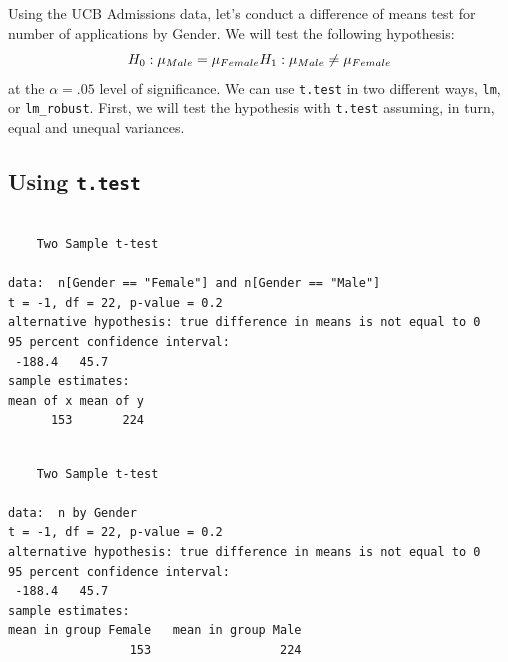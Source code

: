 \documentclass[]{book}
\newenvironment{Shaded}{\begin{snugshade}}{\end{snugshade}}
\newcommand{\CommentTok}[1]{\textcolor[rgb]{0.56,0.35,0.01}{\textit{#1}}}
\newcommand{\DataTypeTok}[1]{\textcolor[rgb]{0.13,0.29,0.53}{#1}}
\newcommand{\KeywordTok}[1]{\textcolor[rgb]{0.13,0.29,0.53}{\textbf{#1}}}
\newcommand{\NormalTok}[1]{#1}
\newcommand{\OperatorTok}[1]{\textcolor[rgb]{0.81,0.36,0.00}{\textbf{#1}}}
\newcommand{\OtherTok}[1]{\textcolor[rgb]{0.56,0.35,0.01}{#1}}
\newcommand{\StringTok}[1]{\textcolor[rgb]{0.31,0.60,0.02}{#1}}
\begin{document}
Using the UCB Admissions data, let's conduct a difference of means test for number of applications by Gender. We will test the following hypothesis: \[H_0: \mu_{Male}=\mu_{Female}\\ H_1: \mu_{Male}\ne\mu_{Female}\] at the \(\alpha=.05\) level of significance. We can use \texttt{t.test} in two different ways, \texttt{lm}, or \texttt{lm\_robust}. First, we will test the hypothesis with \texttt{t.test} assuming, in turn, equal and unequal variances.

\hypertarget{using-t.test}{%
\subsection{\texorpdfstring{Using \texttt{t.test}}{Using t.test}}\label{using-t.test}}

\begin{Shaded}
\end{Shaded}

\begin{verbatim}

    Two Sample t-test

data:  n[Gender == "Female"] and n[Gender == "Male"]
t = -1, df = 22, p-value = 0.2
alternative hypothesis: true difference in means is not equal to 0
95 percent confidence interval:
 -188.4   45.7
sample estimates:
mean of x mean of y 
      153       224 
\end{verbatim}

\begin{Shaded}
\end{Shaded}

\begin{verbatim}

    Two Sample t-test

data:  n by Gender
t = -1, df = 22, p-value = 0.2
alternative hypothesis: true difference in means is not equal to 0
95 percent confidence interval:
 -188.4   45.7
sample estimates:
mean in group Female   mean in group Male 
                 153                  224 
\end{verbatim}
\end{document}
